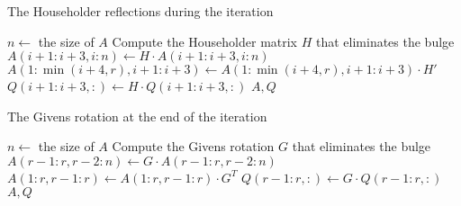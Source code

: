 \documentclass[12pt, a4paper, oneside]{ctexart}
\begin{document}
\begin{appendices}
    \begin{algorithm}
        \caption{The Householder reflections during the iteration}
        \begin{algorithmic}[1]
                \State $n \gets$ the size of $A$
                    \State Compute the Householder matrix $H$ that eliminates the bulge
                    \State $A(i+1:i+3, i:n) \gets H \cdot A(i+1:i+3, i:n)$
                    \State $A(1:\min(i+4, r), i+1:i+3) \gets A(1:\min(i+4, r), i+1:i+3) \cdot H'$
                    \State $Q(i+1:i+3, :) \gets H \cdot Q(i+1:i+3, :)$
                \EndFor
                \State \Return $A, Q$
            \EndFunction
        \end{algorithmic}
    \end{algorithm}

    \begin{algorithm}
        \caption{The Givens rotation at the end of the iteration}
        \begin{algorithmic}[1]
                \State $n \gets$ the size of $A$
                \State Compute the Givens rotation $G$ that eliminates the bulge
                \State $A(r-1:r, r-2:n) \gets G \cdot A(r-1:r, r-2:n)$
                \State $A(1:r, r-1:r) \gets A(1:r, r-1:r) \cdot G^T$
                \State $Q(r-1:r, :) \gets G \cdot Q(r-1:r, :)$
                \State \Return $A, Q$
            \EndFunction
        \end{algorithmic}
    \end{algorithm}
\end{appendices}
\newpage
\end{document}
